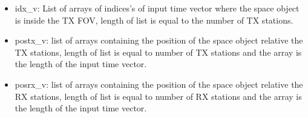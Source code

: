 \documentclass[letterpaper,10pt,english]{sphinxmanual}
\begin{document}
\begin{fulllineitems}
\begin{itemize}
\item {} 
idx\_v: List of arrays of indices’s of input time vector where the space object is inside the TX FOV, length of list is equal to the number of TX stations.

\item {} 
postx\_v: list of arrays containing the position of the space object relative the TX stations, length of list is equal to number of TX stations and the array is the length of the input time vector.

\item {} 
posrx\_v: list of arrays containing the position of the space object relative the RX stations, length of list is equal to number of RX stations and the array is the length of the input time vector.

\end{itemize}

\end{fulllineitems}

\end{document}
